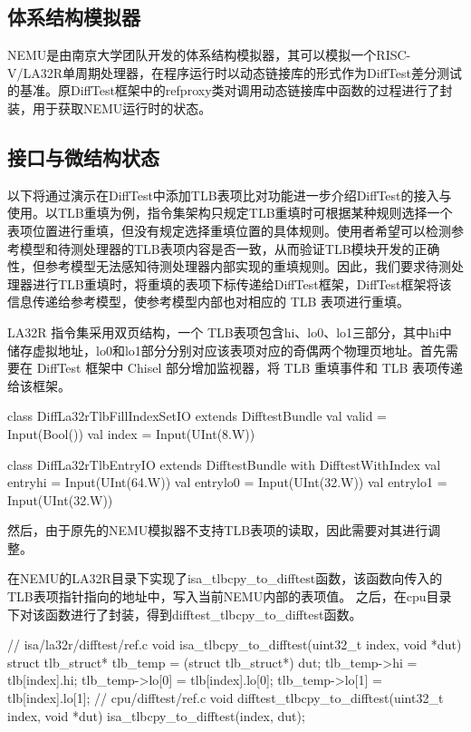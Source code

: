 \subsection{体系结构模拟器}\label{sec:06-agility-016}

NEMU是由南京大学团队开发的体系结构模拟器，其可以模拟一个RISC-V/LA32R单周期处理器，在程序运行时以动态链接库的形式作为DiffTest差分测试的基准。原DiffTest框架中的refproxy类对调用动态链接库中函数的过程进行了封装，用于获取NEMU运行时的状态。

\subsection{接口与微结构状态}\label{sec:06-agility-017}

以下将通过演示在DiffTest中添加TLB表项比对功能进一步介绍DiffTest的接入与使用。以TLB重填为例，指令集架构只规定TLB重填时可根据某种规则选择一个表项位置进行重填，但没有规定选择重填位置的具体规则。使用者希望可以检测参考模型和待测处理器的TLB表项内容是否一致，从而验证TLB模块开发的正确性，但参考模型无法感知待测处理器内部实现的重填规则。因此，我们要求待测处理器进行TLB重填时，将重填的表项下标传递给DiffTest框架，DiffTest框架将该信息传递给参考模型，使参考模型内部也对相应的 TLB 表项进行重填。

LA32R 指令集采用双页结构，一个 TLB表项包含hi、lo0、lo1三部分，其中hi中储存虚拟地址，lo0和lo1部分分别对应该表项对应的奇偶两个物理页地址。首先需要在 DiffTest 框架中 Chisel 部分增加监视器，将 TLB 重填事件和 TLB 表项传递给该框架。

\begin{CodeBlock}[language=BookScala]
class DiffLa32rTlbFillIndexSetIO extends DifftestBundle {
  val valid = Input(Bool())
  val index = Input(UInt(8.W))
}

class DiffLa32rTlbEntryIO extends DifftestBundle with DifftestWithIndex {
  val entryhi = Input(UInt(64.W))
  val entrylo0 = Input(UInt(32.W))
  val entrylo1 = Input(UInt(32.W))
}
\end{CodeBlock}

然后，由于原先的NEMU模拟器不支持TLB表项的读取，因此需要对其进行调整。

在NEMU的LA32R目录下实现了isa\_tlbcpy\_to\_difftest函数，该函数向传入的TLB表项指针指向的地址中，写入当前NEMU内部的表项值。 之后，在cpu目录下对该函数进行了封装，得到difftest\_tlbcpy\_to\_difftest函数。

\begin{CodeBlock}[language=BookCpp]
// isa/la32r/difftest/ref.c
void isa_tlbcpy_to_difftest(uint32_t index, void *dut) {
  struct tlb_struct* tlb_temp = (struct tlb_struct*) dut;
  tlb_temp->hi = tlb[index].hi;
  tlb_temp->lo[0] = tlb[index].lo[0];
  tlb_temp->lo[1] = tlb[index].lo[1];
}
// cpu/difftest/ref.c
void difftest_tlbcpy_to_difftest(uint32_t index, void *dut) {
  isa_tlbcpy_to_difftest(index, dut);
}
\end{CodeBlock}

